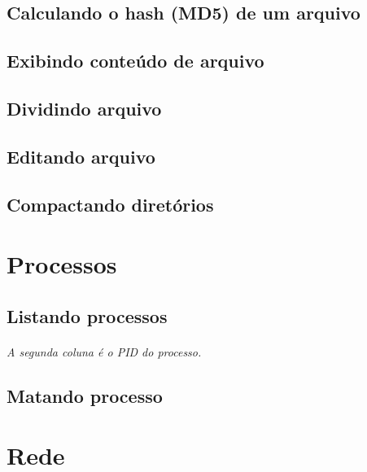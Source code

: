 \documentclass[a4paper,9pt]{extarticle}
\begin{document}
\begin{multicols}{2}
		
\subsection{Calculando o hash (MD5) de um arquivo}

	\paragraph{}
	
\subsection{Exibindo conteúdo de arquivo}
\subsection{Dividindo arquivo}
\subsection{Editando arquivo}
\subsection{Compactando diretórios}
	
	

\section{Processos}
\subsection{Listando processos}
	
	\paragraph{} \emph{A segunda coluna é o PID do processo.} 
	
\subsection{Matando processo}
%
\section{Rede}

\end{multicols}
\end{document}

